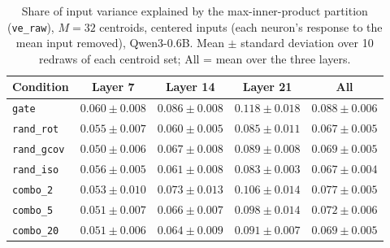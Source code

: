 \begin{table}[t]
\centering
\begin{tabular}{lcccc}
\toprule
Condition & Layer 7 & Layer 14 & Layer 21 & All \\
\midrule
\texttt{gate} & $0.060 \pm 0.008$ & $0.086 \pm 0.008$ & $0.118 \pm 0.018$ & $0.088 \pm 0.006$ \\
\addlinespace
\texttt{rand\_rot} & $0.055 \pm 0.007$ & $0.060 \pm 0.005$ & $0.085 \pm 0.011$ & $0.067 \pm 0.005$ \\
\texttt{rand\_gcov} & $0.050 \pm 0.006$ & $0.067 \pm 0.008$ & $0.089 \pm 0.008$ & $0.069 \pm 0.005$ \\
\texttt{rand\_iso} & $0.056 \pm 0.005$ & $0.061 \pm 0.008$ & $0.083 \pm 0.003$ & $0.067 \pm 0.004$ \\
\addlinespace
\texttt{combo\_2} & $0.053 \pm 0.010$ & $0.073 \pm 0.013$ & $0.106 \pm 0.014$ & $0.077 \pm 0.005$ \\
\texttt{combo\_5} & $0.051 \pm 0.007$ & $0.066 \pm 0.007$ & $0.098 \pm 0.014$ & $0.072 \pm 0.006$ \\
\texttt{combo\_20} & $0.051 \pm 0.006$ & $0.064 \pm 0.009$ & $0.091 \pm 0.007$ & $0.069 \pm 0.005$ \\
\bottomrule
\end{tabular}
\caption{Share of input variance explained by the max-inner-product partition (\texttt{ve\_raw}), $M = 32$ centroids, centered inputs (each neuron's response to the mean input removed), Qwen3-0.6B. Mean $\pm$ standard deviation over 10 redraws of each centroid set; All = mean over the three layers.}
\label{tab:ve-raw-ip-centered-M32}
\end{table}

